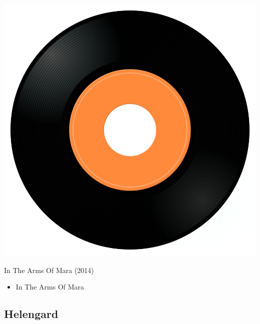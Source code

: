 \begin{minipage}[t]{0.25\textwidth}
\captionsetup{type=figure}
\includegraphics[width=\textwidth]{Images/cover.png}
\caption*{In The Arms Of Mara (2014)}
\end{minipage}
\begin{minipage}[t]{0.25\textwidth}\vspace{0pt}
\begin{itemize}[nosep,leftmargin=1em,labelwidth=*,align=left]
	\setlength{\itemsep}{0pt}
	\item In The Arms Of Mara
\end{itemize}
\end{minipage}

\subsection{Helengard}


